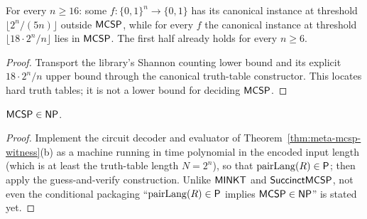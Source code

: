 \begin{theorem}
  \label{thm:meta-mcsp-shannon}
  \leanok
  For every $n \ge 16$: some $f \colon \{0,1\}^n \to \{0,1\}$ has its canonical
  instance at threshold $\lfloor 2^n/(5n) \rfloor$ outside $\mathsf{MCSP}$, while
  for every $f$ the canonical instance at threshold $\lfloor 18 \cdot 2^n / n
  \rfloor$ lies in $\mathsf{MCSP}$. The first half already holds for every
  $n \ge 6$.
\end{theorem}
\begin{proof}
  \leanok
  Transport the library's Shannon counting lower bound and its explicit
  $18 \cdot 2^n/n$ upper bound through the canonical truth-table constructor.
  This locates hard truth tables; it is not a lower bound for deciding
  $\mathsf{MCSP}$.
\end{proof}

\begin{theorem}[$\cc{MCSP} \in \cc{NP}$]
  \label{thm:meta-mcsp-np}
  $\cc{MCSP} \in \cc{NP}$.
\end{theorem}
\begin{proof}
  Implement the circuit decoder and evaluator of
  Theorem~\ref{thm:meta-mcsp-witness}(b) as a machine running in time
  polynomial in the encoded input length (which is at least the truth-table
  length $N = 2^n$), so that $\mathrm{pairLang}(R) \in \mathsf{P}$; then apply the
  guess-and-verify construction. Unlike $\mathsf{MINKT}$ and $\mathsf{SuccinctMCSP}$,
  not even the conditional packaging ``$\mathrm{pairLang}(R) \in \mathsf{P}$
  implies $\cc{MCSP} \in \cc{NP}$'' is stated yet.
\end{proof}

